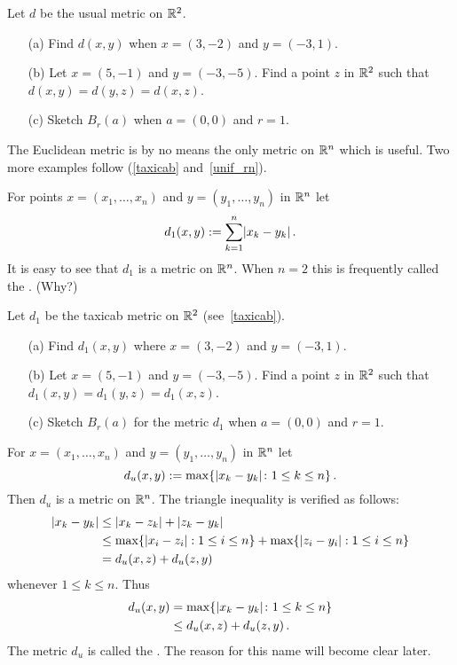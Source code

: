 \begin{prob} Let $d$ be the usual metric on $\mathbb{R}^2$.
 \begin{enumerate}
  \item[(a)] Find $d(x,y)$ when $x = (3,-2)$ and $y = (-3,1)$.
  \item[(b)] Let $x = (5,-1)$ and $y = (-3,-5)$. Find a point $z$ in $\mathbb{R}^2$ such that $d(x,y)
= d(y,z) = d(x,z)$.
  \item[(c)] Sketch $B_r(a)$ when $a = (0,0)$ and $r = 1$.
 \end{enumerate}
\end{prob}

The Euclidean metric is by no means the only metric on $\mathbb{R}^n$ which is useful.  Two more
examples follow (\ref{taxicab} and~\ref{unif_rn}).

\begin{exam}\label{taxicab} For points $x = (x_1,\dots,x_n)$ and $y = (y_1,\dots,y_n)$ in $\mathbb{R}^n$ let
   \[ d_1(x,y) := \sum_{k=1}^n \lvert x_k - y_k\rvert\,. \]
It is easy to see that $d_1$ is a metric on $\mathbb{R}^n$. When $n = 2$ this is frequently called the
. (Why?)
\end{exam}

\begin{prob} Let $d_1$ be the taxicab metric on $\mathbb{R}^2$ (see~\ref{taxicab}).
 \begin{enumerate}
  \item[(a)] Find $d_1(x,y)$ where $x=(3,-2)$ and $y=(-3,1)$.
  \item[(b)] Let $x=(5,-1)$ and $y=(-3,-5)$. Find a point $z$ in $\mathbb{R}^2$  such that $d_1(x,y)
= d_1(y,z) = d_1(x,z)$.
  \item[(c)] Sketch $B_r(a)$ for the metric $d_1$ when $a=(0,0)$ and $r = 1$.
 \end{enumerate}
\end{prob}

\begin{exam}\label{unif_rn} For $x = (x_1,\dots,x_n)$ and $y = (y_1,\dots,y_n)$ in $\mathbb{R}^n$ let
   \[ d_u(x,y) := \max\{\lvert x_k - y_k\rvert \colon 1 \le k \le n\}\,. \]
Then $d_u$ is a metric on $\mathbb{R}^n$. The triangle inequality is verified as follows:
 \begin{align*}
   \lvert x_k - y_k\rvert &\le \lvert x_k - z_k\rvert + \lvert z_k - y_k\rvert \\
                   &\le \max\{\lvert x_i - z_i\rvert: 1 \le i \le n\} +
                                   \max\{\lvert z_i - y_i\rvert: 1 \le i \le n\} \\
                   &= d_u(x,z) + d_u(z,y)
 \end{align*}
whenever $1 \le k \le n$. Thus
 \begin{align*}
     d_u(x,y) &= \max\{\lvert x_k - y_k\rvert \colon 1 \le k \le n\} \\
              &\le d_u(x,z) + d_u(z,y)\,.
 \end{align*}
The metric $d_u$ is called the
. The reason for this name will become clear later.
\end{exam}

